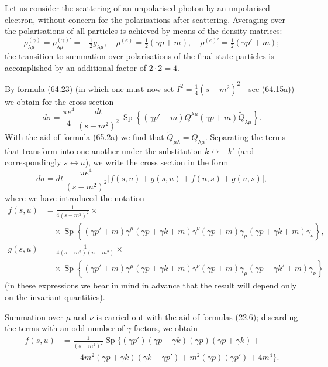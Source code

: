 
Let us consider the scattering of an unpolarised photon by an unpolarised electron, without concern for the polarisations after scattering. Averaging over the polarisations of all particles is achieved by means of the density matrices:
\[
\rho^{(\gamma)}_{\lambda\mu} = \rho^{(\gamma)\prime}_{\lambda\mu} = -\tfrac{1}{2}g_{\lambda\mu}, \quad \rho^{(e)} = \tfrac{1}{2}(\gamma p + m), \quad \rho^{(e)\prime} = \tfrac{1}{2}(\gamma p' + m);
\]
the transition to summation over polarisations of the final-state particles is accomplished by an additional factor of $2 \cdot 2 = 4$.

By formula (64.23) (in which one must now set $I^2 = \frac{1}{4}(s - m^2)^2$---see (64.15a)) we obtain for the cross section
\[
d\sigma = \frac{\pi e^4}{4}\,\frac{dt}{(s - m^2)^2}\,\operatorname{Sp}\!\left\{(\gamma p' + m)Q^{\lambda\mu}(\gamma p + m)\widetilde{Q}_{\lambda\mu}\right\}.
\]
With the aid of formula (65.2a) we find that $\widetilde{Q}_{\mu\lambda} = Q_{\lambda\mu}$. Separating the terms that transform into one another under the substitution $k \leftrightarrow -k'$ (and correspondingly $s \leftrightarrow u$), we write the cross section in the form
\[
d\sigma = dt\,\frac{\pi e^4}{(s - m^2)^2}\bigl[f(s,u) + g(s,u) + f(u,s) + g(u,s)\bigr],
\]
where we have introduced the notation
\begin{align*}
f(s,u) &= \frac{1}{4(s-m^2)^2} \times{} \\
&\quad \times \operatorname{Sp}\!\left\{(\gamma p' + m)\gamma^\mu(\gamma p + \gamma k + m)\gamma^\nu(\gamma p + m)\gamma_\mu(\gamma p + \gamma k + m)\gamma_\nu\right\}, \\[6pt]
g(s,u) &= \frac{1}{4(s-m^2)(u-m^2)} \times{} \\
&\quad \times \operatorname{Sp}\!\left\{(\gamma p' + m)\gamma^\mu(\gamma p + \gamma k + m)\gamma^\nu(\gamma p + m)\gamma_\mu(\gamma p - \gamma k' + m)\gamma_\nu\right\}
\end{align*}
(in these expressions we bear in mind in advance that the result will depend only on the invariant quantities).

Summation over $\mu$ and $\nu$ is carried out with the aid of formulas (22.6); discarding the terms with an odd number of $\gamma$ factors, we obtain
\begin{align*}
f(s,u) &= \frac{1}{(s-m^2)^2}\operatorname{Sp}\!\bigl\{(\gamma p')(\gamma p + \gamma k)(\gamma p)(\gamma p + \gamma k) + {} \\
&\quad {} + 4m^2(\gamma p + \gamma k)(\gamma k - \gamma p') + m^2(\gamma p)(\gamma p') + 4m^4\bigr\}.
\end{align*}


